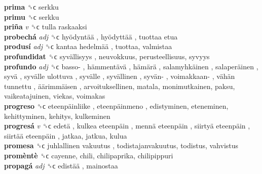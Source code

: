 \textbf{prima} ␝ϲ  serkku  \\
\textbf{primu} ␝ϲ  serkku  \\
\textbf{priña} \emph{v}  ␝ϲ   tulla raskaaksi   \\
\textbf{probechá} \emph{adj}  ␝ϲ   hyödyntää ,  hyödyttää ,  tuottaa etua   \\
\textbf{produsí} \emph{adj}  ␝ϲ   kantaa hedelmää , tuottaa, valmistaa  \\
\textbf{profundidat} ␝ϲ   syvällisyys , neuvokkuus, perusteellisuus, syvyys  \\
\textbf{profundo} \emph{adj}  ␝ϲ   basso- ,  hämmentävä ,  hämärä ,  salamyhkäinen ,  salaperäinen ,  syvä ,  syvälle ulottuva ,  syvälle ,  syvällinen ,  syvän- ,  voimakkaan- ,  vähän tunnettu ,  äärimmäisen , arvoituksellinen, matala, monimutkainen, paksu, vaikeatajuinen, viekas, voimakas  \\
\textbf{progreso} ␝ϲ   eteenpäinliike ,  eteenpäinmeno , edistyminen, eteneminen, kehittyminen, kehitys, kulkeminen  \\
\textbf{progresá} \emph{v}  ␝ϲ   edetä ,  kulkea eteenpäin ,  mennä eteenpäin ,  siirtyä eteenpäin ,  siirtää eteenpäin , jatkaa, jatkua, kulua  \\
\textbf{promesa} ␝ϲ   juhlallinen vakuutus , todistajanvakuutus, todistus, vahvistus  \\
\textbf{promèntè} ␝ϲ  cayenne, chili, chilipaprika, chilipippuri  \\
\textbf{propagá} \emph{adj}  ␝ϲ   edistää , mainostaa  \\
